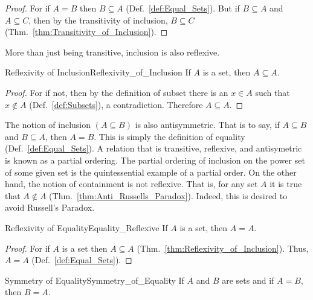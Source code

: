         \begin{proof}
            For if $A=B$ then $B\subseteq{A}$ (Def.~\ref{def:Equal_Sets}).
            But if $B\subseteq{A}$ and $A\subseteq{C}$, then by the transitivity
            of inclusion, $B\subseteq{C}$
            (Thm.~\ref{thm:Transitivity_of_Inclusion}).
        \end{proof}
        More than just being transitive, inclusion is also reflexive.
        \begin{ltheorem}{Reflexivity of Inclusion}{Reflexivity_of_Inclusion}
            If $A$ is a set, then $A\subseteq{A}$.
        \end{ltheorem}
        \begin{proof}
            For if not, then by the definition of subset there is an $x\in{A}$
            such that $x\notin{A}$ (Def.~\ref{def:Subsets}), a contradiction.
            Therefore $A\subseteq{A}$.
        \end{proof}
        The notion of inclusion $(A\subseteq{B})$ is also
        antisymmetric. That is to say, if
        $A\subseteq{B}$ and $B\subseteq{A}$, then $A=B$. This is simply the
        definition of equality (Def.~\ref{def:Equal_Sets}). A relation that is
        transitive, reflexive, and antisymetric is known as a partial
        ordering. The partial ordering of inclusion on the
        power set of some given set is the quintessential example of a partial
        order. On the other hand, the notion of containment is not reflexive.
        That is, for any set $A$ it is true that $A\notin{A}$
        (Thm.~\ref{thm:Anti_Russells_Paradox}). Indeed, this is desired to avoid
        Russell's Paradox.
        \begin{ltheorem}{Reflexivity of Equality}{Equality_Reflexive}
            If $A$ is a set, then $A=A$.
        \end{ltheorem}
        \begin{proof}
            For if $A$ is a set then $A\subseteq{A}$
            (Thm.~\ref{thm:Reflexivity_of_Inclusion}). Thus, $A=A$
            (Def.~\ref{def:Equal_Sets}).
        \end{proof}
        \begin{ltheorem}{Symmetry of Equality}{Symmetry_of_Equality}
            If $A$ and $B$ are sets and if $A=B$, then $B=A$.
        \end{ltheorem}
